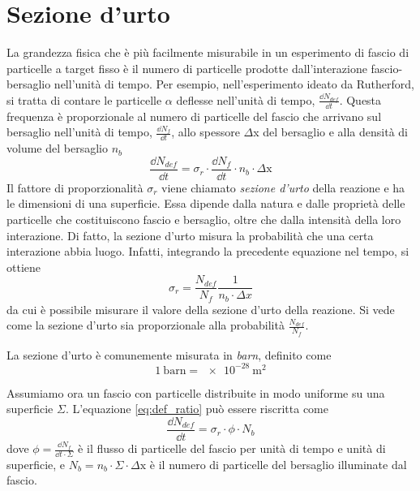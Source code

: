\documentclass[../main.tex]{subfiles}
\begin{document}
\section{Sezione d'urto}
La grandezza fisica che è più facilmente misurabile in un esperimento di fascio di particelle a target fisso è il numero di particelle prodotte dall'interazione fascio-bersaglio nell'unità di tempo. Per esempio, nell'esperimento ideato da Rutherford, si tratta di contare le particelle $\alpha$ deflesse nell'unità di tempo, $\frac{\dd N_{def}}{\dd t}$. 
Questa frequenza è proporzionale al numero di particelle del fascio che arrivano sul bersaglio nell'unità di tempo, $\frac{\dd N_f}{\dd t}$, allo spessore $\Delta$x del bersaglio e alla densità di volume del bersaglio $n_b$
\begin{equation} \label{eq:def_ratio}
    \frac{\dd N_{def}}{\dd t} = \sigma_r \cdot \frac{\dd N_f}{\dd t} \cdot n_b \cdot \Delta \mathrm{x}
\end{equation}
Il fattore di proporzionalità $\sigma_r$ viene chiamato \emph{sezione d'urto} della reazione e ha le dimensioni di una superficie. Essa dipende dalla natura e dalle proprietà delle particelle che costituiscono fascio e bersaglio, oltre che dalla intensità della loro interazione. Di fatto, la sezione d'urto misura la probabilità che una certa interazione abbia luogo. Infatti, integrando la precedente equazione nel tempo, si ottiene 
\begin{equation}
    \sigma_r = \frac{N_{def}}{N_f} \frac{1}{n_b \cdot \Delta x}
\end{equation}
da cui è possibile misurare il valore della sezione d'urto della reazione. Si vede come la sezione d'urto sia proporzionale alla probabilità $\frac{N_{def}}{N_f}$.

La sezione d'urto è comunemente misurata in \emph{barn}, definito come
\begin{equation}
    1\ \mathrm{barn} = \SI{e-28}{\m ^2}
\end{equation}

Assumiamo ora un fascio con particelle distribuite in modo uniforme su una superficie $\Sigma$. L'equazione \ref{eq:def_ratio} può essere riscritta come 
\begin{equation}
    \frac{\dd N_{def}}{\dd t} = \sigma_r \cdot \phi \cdot N_b
\end{equation}
dove $\phi = \frac{\dd N_f}{\dd t \cdot \Sigma}$ è il flusso di particelle del fascio per unità di tempo e unità di superficie, e $N_b = n_b \cdot \Sigma \cdot \Delta \mathrm{x}$ è il numero di particelle del bersaglio illuminate dal fascio. 
\end{document}
